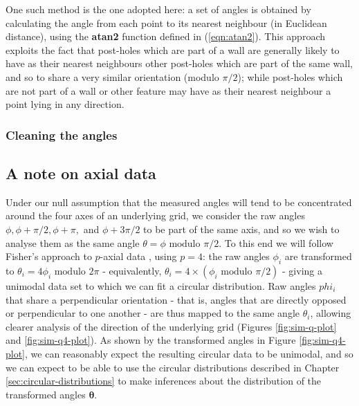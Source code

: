 \documentclass[../../ArchStats.tex]{subfiles}
\begin{document}
One such method is the one adopted here: a set of angles is obtained by calculating the angle from each point to its nearest neighbour (in Euclidean distance), using the \textbf{atan2} function defined in (\ref{eqn:atan2}). This approach exploits the fact that post-holes which are part of a wall are generally likely to have as their nearest neighbours other post-holes which are part of the same wall, and so to share a very similar orientation (modulo $\pi/2$); while post-holes which are not part of a wall or other feature may have as their nearest neighbour a point lying in any direction.

\subsubsection{Cleaning the angles}




\subsection{A note on axial data}
Under our null assumption that the measured angles will tend to be concentrated around the four axes of an underlying grid, we consider the raw angles $\phi, \phi + \pi/2, \phi + \pi,$ and $\phi + 3\pi/2$ to be part of the same axis, and so we wish to analyse them as the same angle $\theta = \phi \text{ modulo }\pi/2$.
To this end we will follow Fisher's approach to $p$-axial data \cite{Fisher1993}, using $p=4$: the raw angles $\phi_i$ are transformed to $\theta_i = 4\phi_i \text{ modulo } 2\pi$ - equivalently, $\theta_i = 4 \times (\phi_i \text{ modulo }\pi/2)$ - giving a unimodal data set to which we can fit a circular distribution. Raw angles $phi_i$ that share a perpendicular orientation - that is, angles that are directly opposed or perpendicular to one another - are thus mapped to the same angle $\theta_i$, allowing clearer analysis of the direction of the underlying grid (Figures \ref{fig:sim-q-plot} and \ref{fig:sim-q4-plot}). As shown by the transformed angles in Figure \ref{fig:sim-q4-plot}, we can reasonably expect the resulting circular data to be unimodal, and so we can expect to be able to use the circular distributions described in Chapter \ref{sec:circular-distributions} to make inferences about the distribution of the transformed angles $\mathbf{\theta}$.
\end{document}
